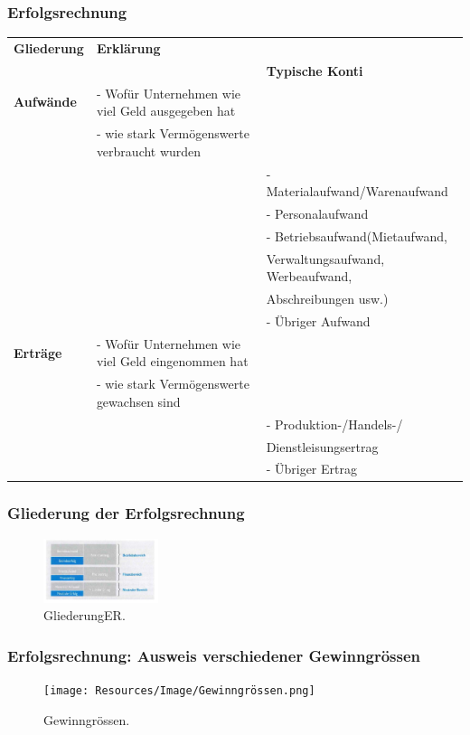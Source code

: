\documentclass[../ZF_Wing.tex]{subfiles}
\begin{document}
\subsubsection{Erfolgsrechnung}
\begin{table}[H]
\begin{tabular}{l|l|l}
\colorbox{orange!30} {\textbf{Gliederung}} & \colorbox{orange!30} {\textbf{Erklärung}}\\& & \colorbox{orange!30} {\textbf{Typische Konti}}\\
\hline
\textbf{Aufwände} & - Wofür Unternehmen wie viel Geld ausgegeben hat \\
& - wie stark Vermögenswerte verbraucht wurden\\
&& - Materialaufwand/Warenaufwand\\
&& - Personalaufwand \\
&& - Betriebsaufwand(Mietaufwand,\\
&&  Verwaltungsaufwand, Werbeaufwand,\\
&&  Abschreibungen usw.)\\
&& - Übriger Aufwand\\


\hline
\textbf{Erträge} & - Wofür Unternehmen wie viel Geld eingenommen hat \\
& - wie stark Vermögenswerte gewachsen sind\\
&& - Produktion-/Handels-/\\
&& Dienstleisungsertrag\\
&& - Übriger Ertrag \\
\end{tabular}
\end{table}


\subsubsection{Gliederung der Erfolgsrechnung}
\begin{figure}[H]
\centering
\includegraphics[width=0.3\textwidth]{Resources/Image/GliederungER.png}
\caption{\label{fig:GliederungER}GliederungER.}
\end{figure}

\subsubsection{Erfolgsrechnung: Ausweis verschiedener Gewinngrössen}
\begin{figure}[H]
\centering
\texttt{[image: Resources/Image/Gewinngrössen.png]}
\caption{\label{fig:Gewinngrössen}Gewinngrössen.}
\end{figure}
\end{document}

